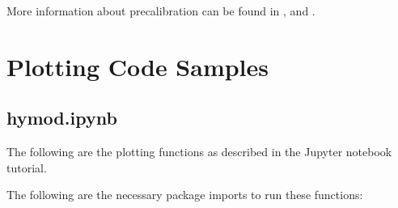 \documentclass[a4paper,10pt,english]{book}
\begin{document}
\sphinxAtStartPar
More information about pre\sphinxhyphen{}calibration can be found in ,
and .


\chapter{Plotting Code Samples}
\label{\detokenize{A3_plotting_code:plotting-code-samples}}\label{\detokenize{A3_plotting_code::doc}}

\section{hymod.ipynb}
\label{\detokenize{A3_plotting_code:hymod-ipynb}}
\sphinxAtStartPar
The following are the plotting functions as described in the  Jupyter notebook tutorial.

\sphinxAtStartPar
The following are the necessary package imports to run these functions:

\begin{sphinxVerbatim}[commandchars=\\\{\}]
   
   
   

   
\end{sphinxVerbatim}
\end{document}

